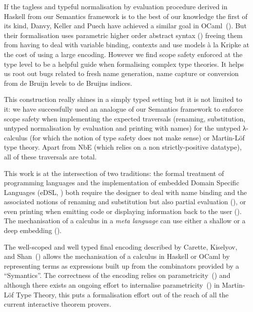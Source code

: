 If the tagless and typeful normalisation by evaluation procedure derived in Haskell
from our Semantics framework is to the best of our knowledge the first of its kind,
Danvy, Keller and Puech have achieved a similar goal in OCaml~(\citeyear{danvytagless}).
But their formalisation uses parametric higher order abstract syntax
(\cite{chlipala2008parametric})
freeing them from having to deal with variable binding, contexts and use models à
la Kripke at the cost of using a large encoding. However we find scope safety
enforced at the type level to be a helpful guide when formalising complex
type theories. It helps us root out bugs related to fresh name generation,
name capture or conversion from de Bruijn levels to de Bruijns indices.

This construction really shines in a simply typed setting but it is not
limited to it: we have successfully used an analogue of our Semantics
framework to enforce scope safety when implementing the expected traversals
(renaming, substitution, untyped normalisation by evaluation and printing
with names) for the untyped λ-calculus (for which the notion of type safety
does not make sense) or Martin-Löf type theory. Apart from NbE (which relies
on a non strictly-positive datatype), all of these traversals are total.

This work is at the intersection of two traditions: the formal treatment
of programming languages and the implementation of embedded Domain Specific
Languages (eDSL, \cite{hudak1996building}) both require the designer to
deal with name binding and the associated notions of renaming and substitution
but also partial evaluation (\cite{danvy1999type}), or even printing when
emitting code or displaying information back to the user (\cite{wiedijk2012pollack}).
The mechanisation of a calculus in a \emph{meta language} can use either
a shallow or a deep embedding (\cite{svenningsson2013combining,gill2014domain}).


The well-scoped and well typed final encoding described by Carette, Kiselyov,
and Shan~(\citeyear{carette2009finally}) allows the mechanisation of a calculus in
Haskell or OCaml by representing terms as expressions built up from the
combinators provided by a ``Symantics''. The correctness of the encoding
relies on parametricity~(\cite{reynolds1983types}) and although there exists
an ongoing effort to internalise parametricity~(\cite{bernardy2013type}) in
Martin-Löf Type Theory, this puts a formalisation effort out of the reach of all the
current interactive theorem provers.

